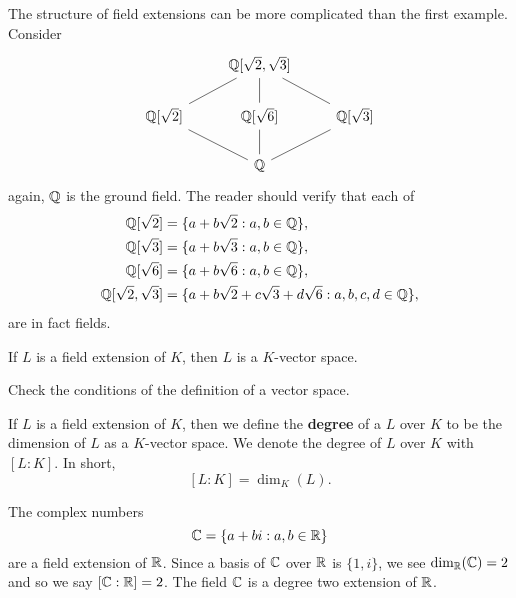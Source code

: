 \documentclass{ximera}
\begin{document}
\begin{example}
  The structure of field extensions can be more complicated than the
  first example. Consider
  \[
  \begin{tikzcd}
    & \Q[\sqrt{2},\sqrt{3}]\ar[rd,-] \ar[d,-] \ar[ld,-]& \\
    \Q[\sqrt{2}] \ar[rd,-]& \Q[\sqrt{6}] \ar[d,-]& \Q[\sqrt{3}]\ar[ld,-]\\
    &  \Q & 
  \end{tikzcd}
  \]
  again, $\mathbb Q$ is the ground field.  The reader should verify that each
  of
  \begin{align*}
    \mathbb Q[\sqrt{2}] &=\{a + b\sqrt{2}: a,b\in \mathbb Q\},\\
    \mathbb Q[\sqrt{3}] &=\{a + b\sqrt{3}: a,b\in \mathbb Q\},\\
    \mathbb Q[\sqrt{6}] &=\{a + b\sqrt{6}: a,b\in \mathbb Q\},\\
    \mathbb Q[\sqrt{2},\sqrt{3}] &=\{a + b\sqrt{2} + c\sqrt{3} + d\sqrt{6}: a,b,c,d\in \mathbb Q\},
  \end{align*}
  are in fact fields.
\end{example}



\begin{lemma}
  If $L$ is a field extension of $K$, then $L$ is a $K$-vector space.
  \begin{sketch}
    Check the conditions of the definition of a vector space.
  \end{sketch}
\end{lemma}

\begin{definition}
  If $L$ is a field extension of $K$, then we define the
  \textbf{degree} of a $L$ over $K$ to be the dimension of $L$ as a
  $K$-vector space. We denote the degree of $L$ over $K$ with
  $[L:K]$. In short,
  \[
  [L:K] = \dim_K(L).
  \]
\end{definition}

\begin{example}
  The complex numbers
  \[
  \mathbb C = \{a+bi:a,b\in\mathbb R\}
  \]
  are a field extension of $\mathbb R$. Since a basis of $\mathbb C$ over $\mathbb R$ is
  $\{1,i\}$, we see $\dim_\mathbb R(\mathbb C)=2$ and so we say $[\mathbb C:\mathbb R]=2$. The
  field $\mathbb C$ is a degree two extension of $\mathbb R$.
\end{example}
\end{document}
